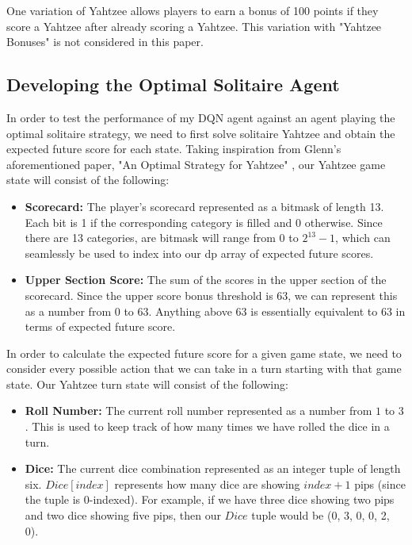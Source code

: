 \documentclass[12pt]{article}
\begin{document}
\noindent
One variation of Yahtzee allows players to earn a bonus of 100 points if they score a Yahtzee after already scoring a Yahtzee. This variation with "Yahtzee Bonuses" is not considered in this paper. 

\subsection{Developing the Optimal Solitaire Agent}
In order to test the performance of my DQN agent against an agent playing the optimal solitaire strategy, we need to first solve solitaire Yahtzee and obtain the expected future score for each state. Taking inspiration from Glenn's aforementioned paper, "An Optimal Strategy for Yahtzee" \cite{glenn}, our Yahtzee game state will consist of the following:

\begin{itemize}
    \item \textbf{Scorecard:} The player's scorecard represented as a bitmask of length 13. Each bit is 1 if the corresponding category is filled and 0 otherwise. Since there are 13 categories, are bitmask will range from $0$ to $2^{13} - 1$, which can seamlessly be used to index into our dp array of expected future scores.
    \item \textbf{Upper Section Score:} The sum of the scores in the upper section of the scorecard. Since the upper score bonus threshold is 63, we can represent this as a number from $0$ to $63$. Anything above 63 is essentially equivalent to 63 in terms of expected future score.
\end{itemize}

\noindent
In order to calculate the expected future score for a given game state, we need to consider every possible action that we can take in a turn starting with that game state. Our Yahtzee turn state will consist of the following:

\begin{itemize}
    \item \textbf{Roll Number:} The current roll number represented as a number from $1$ to $3$. This is used to keep track of how many times we have rolled the dice in a turn.
    \item \textbf{Dice:} The current dice combination represented as an integer tuple of length six. $Dice[index]$ represents how many dice are showing $index + 1$ pips (since the tuple is 0-indexed). For example, if we have three dice showing two pips and two dice showing five pips, then our $Dice$ tuple would be (0, 3, 0, 0, 2, 0).
\end{itemize}
\end{document}
